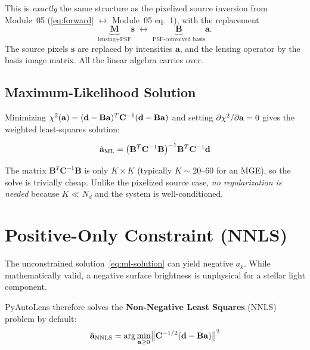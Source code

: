 \documentclass[11pt, letterpaper]{article}
\begin{document}
This is \emph{exactly} the same structure as the pixelized source
inversion from Module~05 (\cref{eq:forward} $\leftrightarrow$
Module~05 eq.~1), with the replacement
\[
  \underbrace{\mathbf{M}}_{\text{lensing+PSF}} \mathbf{s}
  \;\longleftrightarrow\;
  \underbrace{\mathbf{B}}_{\text{PSF-convolved basis}} \mathbf{a}.
\]
The source pixels $\mathbf{s}$ are replaced by intensities $\mathbf{a}$,
and the lensing operator by the basis image matrix.  All the linear
algebra carries over.

\subsection{Maximum-Likelihood Solution}

Minimizing $\chi^2(\mathbf{a}) = (\mathbf{d} - \mathbf{B}\mathbf{a})^T
\mathbf{C}^{-1}(\mathbf{d} - \mathbf{B}\mathbf{a})$ and setting
$\partial\chi^2/\partial\mathbf{a} = 0$ gives the weighted
least-squares solution:

\begin{keyresult}[title={ML Intensity Solution}]
\begin{equation}
  \hat{\mathbf{a}}_{\rm ML}
  = \bigl(\mathbf{B}^T \mathbf{C}^{-1} \mathbf{B}\bigr)^{-1}
    \mathbf{B}^T \mathbf{C}^{-1} \mathbf{d}
  \label{eq:ml-solution}
\end{equation}
\end{keyresult}

\noindent The matrix $\mathbf{B}^T\mathbf{C}^{-1}\mathbf{B}$ is only
$K \times K$ (typically $K \sim 20$--60 for an MGE), so the solve is
trivially cheap.  Unlike the pixelized source case, \emph{no
regularization is needed} because $K \ll N_d$ and the system is
well-conditioned.

\section{Positive-Only Constraint (NNLS)}
\label{sec:nnls}

The unconstrained solution~\eqref{eq:ml-solution} can yield negative
$a_k$.  While mathematically valid, a negative surface brightness is
unphysical for a stellar light component.

PyAutoLens therefore solves the \textbf{Non-Negative Least Squares}
(NNLS) problem by default:
\begin{equation}
  \hat{\mathbf{a}}_{\rm NNLS}
  = \arg\min_{\mathbf{a} \ge 0}
    \bigl\|\mathbf{C}^{-1/2}(\mathbf{d} - \mathbf{B}\mathbf{a})\bigr\|^2
  \label{eq:nnls}
\end{equation}
\end{document}
